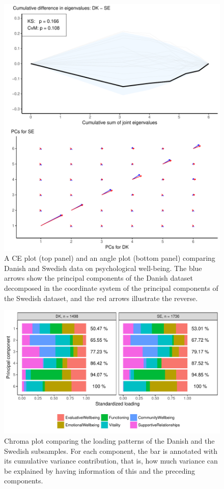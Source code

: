 \documentclass[a4paper,12pt]{article}
\begin{document}
\begin{figure}[H]
\center
\includegraphics[scale=0.8]{Figure8_v2.pdf}
\caption{A CE plot (top panel) and an angle plot (bottom panel) comparing Danish and Swedish data on psychological well-being. The blue arrows show the principal components of the Danish dataset decomposed in the coordinate system of the principal components of the Swedish dataset, and the red arrows illustrate the reverse.}
\label{plotSE.cehair}
\end{figure}

\begin{figure}[H]
\center
\includegraphics[scale=0.8]{Figure9_v2.pdf}
\caption{Chroma plot comparing the loading patterns of the Danish and the Swedish subsamples. For each component, the bar is annotated with its cumulative variance contribution, that is, how much variance can be explained by having information of this and the preceding components.}
\label{plotSE.pancake}
\end{figure}
\end{document}
